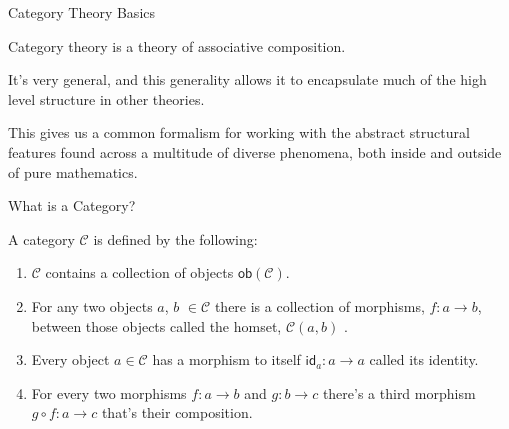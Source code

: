 \documentclass{beamer}
\begin{document}
\begin{frame}{Category Theory Basics}
    \begin{large}
        Category theory is a theory of associative composition.

        \vspace*{0.25in}
        It's very general, and this generality allows it to encapsulate much of the high level structure in other theories.

        \vspace*{0.25in}
        This gives us a common formalism for working with the abstract structural features found across a multitude of diverse phenomena, both inside and outside of pure mathematics.

    \end{large}

\end{frame}


\begin{frame}{What is a Category?}
    \begin{definition}[Category]

        \vspace*{0.125in}
        A category $\mathcal{C}$ is defined by the following:
        \begin{enumerate}
            \item $\mathcal{C}$ contains a collection of objects $\mathsf{ob}(\mathcal{C})$.
            \item For any two objects $a$, $b$ $\in \mathcal{C}$ there is a collection of morphisms, $f:a \rightarrow b$, between those objects called the homset, $\mathcal{C}(a,b)$ .
            \item Every object $a\in \mathcal{C}$ has a morphism to itself $\mathsf{id}_a:a\rightarrow a$ called its identity.
            \item For every two morphisms $f:a\rightarrow b$ and $g: b\rightarrow c$ there's a third morphism $g\circ f:a\rightarrow c$ that's their composition.
        \end{enumerate}
    \end{definition}
\end{frame}
\end{document}
